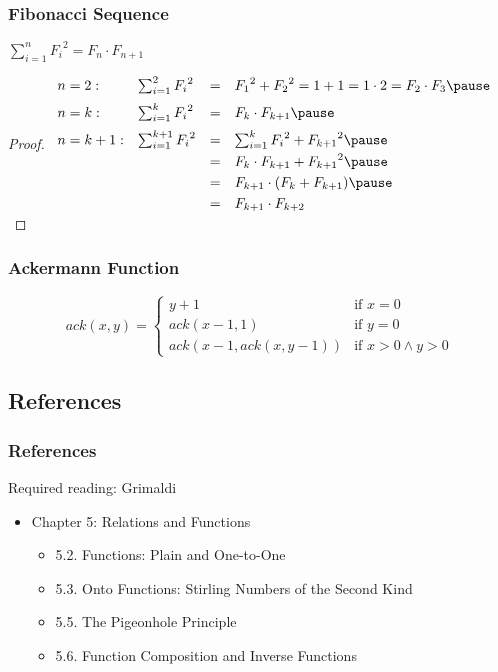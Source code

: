 \documentclass[dvipsnames]{beamer}
\begin{document}
\begin{frame}
  \frametitle{Fibonacci Sequence}

  \begin{theorem}
    $\sum_{i=1}^{n} {F_i}^2 = F_n \cdot F_{n+1}$
  \end{theorem}

  \pause
  \begin{proof}
    $\begin{array}{llcl}
      n=2:   & \sum_{i=1}^{2} {F_i}^2   & = & {F_1}^2+{F_2}^2=1+1=1 \cdot 2=F_2 \cdot F_3
      \pause
      \medskip\\
      n=k:   & \sum_{i=1}^{k} {F_i}^2   & = & F_k \cdot F_{k+1}
      \pause
      \medskip\\
      n=k+1: & \sum_{i=1}^{k+1} {F_i}^2 & = & \sum_{i=1}^{k} {F_i}^2 + {F_{k+1}}^2
      \pause
      \smallskip\\
             &                          & = & F_k \cdot F_{k+1} + {F_{k+1}}^2
      \pause
      \smallskip\\
             &                          & = & F_{k+1} \cdot (F_k + F_{k+1})
      \pause
      \smallskip\\
             &                          & = & F_{k+1} \cdot F_{k+2}
    \end{array}$
  \end{proof}
\end{frame}

\begin{frame}
  \frametitle{Ackermann Function}

  \[
    ack(x,y) =
      \begin{cases}
        y+1                 & \mbox{if } x = 0\\
        ack(x-1, 1)         & \mbox{if } y = 0\\
        ack(x-1,ack(x,y-1)) & \mbox{if } x > 0 \wedge y > 0
      \end{cases}
  \]
\end{frame}

\subsection*{References}

\begin{frame}
  \frametitle{References}

  \begin{block}{Required reading: Grimaldi}
    \begin{itemize}
      \item Chapter 5: Relations and Functions
      \begin{itemize}
        \item 5.2. \alert{Functions: Plain and One-to-One}
        \item 5.3. \alert{Onto Functions: Stirling Numbers of the Second Kind}
        \item 5.5. \alert{The Pigeonhole Principle}
        \item 5.6. \alert{Function Composition and Inverse Functions}
      \end{itemize}
    \end{itemize}
  \end{block}
\end{frame}
\end{document}
